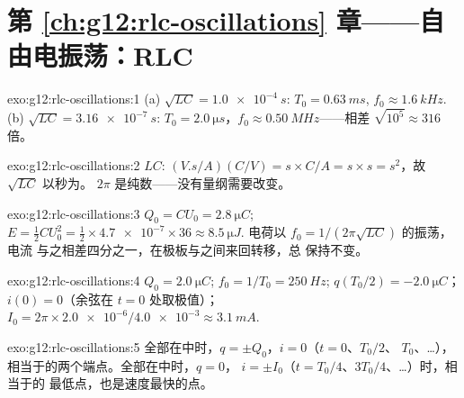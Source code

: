 \section*{第 \ref{ch:g12:rlc-oscillations} 章——自由电振荡：RLC}

\begin{solution}{exo:g12:rlc-oscillations:1}
(a) $\sqrt{LC} = \qty{1.0e-4}{s}$: $T_0 = \qty{0.63}{ms}$,
$f_0 \approx \qty{1.6}{kHz}$. (b) $\sqrt{LC} = \qty{3.16e-7}{s}$:
$T_0 = \qty{2.0}{\micro s}$，$f_0 \approx \qty{0.50}{MHz}$——相差
$\sqrt{10^5} \approx 316$ 倍。
\end{solution}

\begin{solution}{exo:g12:rlc-oscillations:2}
$LC$: $(\unit{V.s/A})(\unit{C/V}) = \unit{s} \times \unit{C/A} =
\unit{s} \times \unit{s} = \unit{s^2}$，故 $\sqrt{LC}$ 以秒为。
$2\pi$ 是纯数——没有量纲需要改变。
\end{solution}

\begin{solution}{exo:g12:rlc-oscillations:3}
$Q_0 = CU_0 = \qty{2.8}{\micro C}$; $E = \tfrac12 CU_0^2 =
\tfrac12 \times \num{4.7e-7} \times 36 \approx \qty{8.5}{\micro J}$.
电荷以 $f_0 = 1/(2\pi\sqrt{LC})$ 的振荡，电流
与之相差四分之一，在极板与之间来回转移，总
保持不变。
\end{solution}

\begin{solution}{exo:g12:rlc-oscillations:4}
$Q_0 = \qty{2.0}{\micro C}$; $f_0 = 1/T_0 = \qty{250}{Hz}$;
$q(T_0/2) = \qty{-2.0}{\micro C}$；$i(0) = 0$（余弦在 $t=0$ 处取极值）；
$I_0 = 2\pi \times \num{2.0e-6}/\num{4.0e-3} \approx \qty{3.1}{mA}$.
\end{solution}

\begin{solution}{exo:g12:rlc-oscillations:5}
全部在中时，$q = \pm Q_0$，$i = 0$（$t = 0$、$T_0/2$、
$T_0$、\dots），相当于的两个端点。全部在中时，$q = 0$，
$i = \pm I_0$（$t = T_0/4$、$3T_0/4$、\dots）时，相当于的
最低点，也是速度最快的点。
\end{solution}

